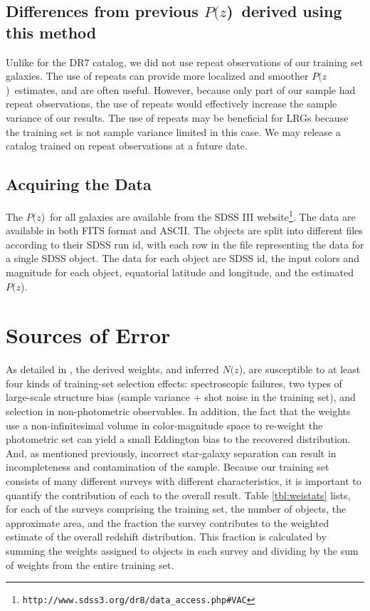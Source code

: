 \documentclass[12pt,preprint]{aastex}
\newcommand{\pofz}{$P(z$)}
\newcommand{\nofz}{$N(z$)}
\newcommand{\downloadURL}{{\tt http://www.sdss3.org/dr8/data\_access.php\#VAC}}
\begin{document}
\subsection{Differences from previous \pofz\ derived using this method}

Unlike for the DR7 catalog, we
did not use repeat observations of our training set galaxies.  The use of
repeats can provide more localized and smoother \pofz\ estimates, and are often
useful.  However, because only part of our sample had repeat observations, the
use of repeats would effectively increase the sample variance of our results.
The use of repeats may be beneficial for LRGs because the training set is not
sample variance limited in this case.  We may release a catalog trained on
repeat observations at a future date.  

\subsection{Acquiring the Data} \label{sec:get}

The \pofz\ for all galaxies are available from the SDSS III
website\footnote{\downloadURL}.  The data are available in both FITS format and
ASCII.  The objects are split into different files according to their SDSS run
id, with each row in the file representing the data for a single SDSS object.
The data for each object are SDSS id, the input colors and magnitude for each
object, equatorial latitude and longitude, and the estimated \pofz.



\section{Sources of Error} \label{sec:errors}

As detailed in \cite{CunhaPhotoz09}, the derived weights, and inferred \nofz,
are susceptible to at least four kinds of training-set selection effects:
spectroscopic failures, two types of large-scale structure bias (sample variance + shot
noise in the training set), and selection in non-photometric observables.  In
addition, the fact that the weights use a non-infinitesimal volume in color-magnitude
space to re-weight the photometric set can yield a small Eddington bias to the
recovered distribution.  And, as mentioned previously, incorrect star-galaxy
separation can result in incompleteness and contamination of the sample.
Because our training set consists of many different surveys with different
characteristics, it is important to quantify the contribution of each to the
overall result.  Table \ref{tbl:weistats} lists, for each of the surveys
comprising the training set, the number of objects, the approximate area, and
the fraction the survey contributes to the weighted estimate of the overall
redshift distribution.  This fraction is calculated by summing the weights
assigned to objects in each survey and dividing by the sum of weights from the
entire training set.
\end{document}
